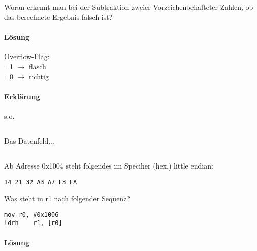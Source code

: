 \subsection{}

Woran erkennt man bei der Subtraktion zweier Vorzeichenbehafteter Zahlen, ob das berechnete Ergebnis falsch ist?

\paragraph{Lösung}
Overflow-Flag:\\
=1 $\rightarrow$ flasch\\
=0 $\rightarrow$ richtig

\paragraph{Erklärung}
s.o.
\subsection{}
Das Datenfeld...


\subsection{}

Ab Adresse 0x1004 steht folgendes im Speciher (hex.) little endian:
\begin{lstlisting}
14 21 32 A3 A7 F3 FA
\end{lstlisting}
Was steht in r1 nach folgender Sequenz?

\begin{lstlisting}
mov	r0, #0x1006
ldrh	r1, [r0]
\end{lstlisting}

\paragraph{Lösung}


